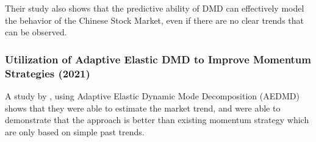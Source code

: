 Their study also shows that the predictive ability of DMD can effectively 
model the behavior of the Chinese Stock Market, even if there are no 
clear trends that can be observed.

\subsubsection{Utilization of Adaptive Elastic DMD to Improve Momentum Strategies (2021)}
\label{subsubsec:dmd_adaptive_elastic}
A study by , using Adaptive Elastic Dynamic Mode Decomposition 
(AEDMD) shows that they were able to estimate the market trend, and were able to 
demonstrate that the approach is better than existing momentum strategy which 
are only based on simple past trends.